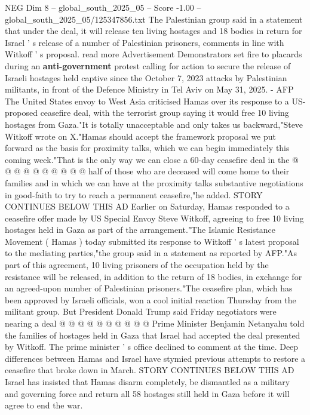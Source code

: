 \begin{textsample}{NEG Dim 8 – global\_south\_2025\_05 – Score -1.00 – global\_south\_2025\_05/125347856.txt}  \label{ex:f8_neg_309}
The Palestinian group said in a statement that under the deal, it will release ten living hostages and 18 bodies in return for Israel ' s release of a number of Palestinian prisoners, comments in line with Witkoff ' s proposal. read more Advertisement Demonstrators set fire to placards during an \textbf{anti-government} protest calling for action to secure the release of Israeli hostages held captive since the October 7, 2023 attacks by Palestinian militants, in front of the Defence Ministry in Tel Aviv on May 31, 2025. - AFP The United States envoy to West Asia criticised Hamas over its response to a US-proposed ceasefire deal, with the terrorist group saying it would free 10 living hostages from Gaza."It is totally unacceptable and only takes us backward,"Steve Witkoff wrote on X."Hamas should accept the framework proposal we put forward as the basis for proximity talks, which we can begin immediately this coming week."That is the only way we can close a 60-day ceasefire deal in the @ @ @ @ @ @ @ @ @ @ half of those who are deceased will come home to their families and in which we can have at the proximity talks substantive negotiations in good-faith to try to reach a permanent ceasefire,"he added.
STORY CONTINUES BELOW THIS AD Earlier on Saturday, Hamas responded to a ceasefire offer made by US Special Envoy Steve Witkoff, agreeing to free 10 living hostages held in Gaza as part of the arrangement."The Islamic Resistance Movement ( Hamas ) today submitted its response to Witkoff ' s latest proposal to the mediating parties,"the group said in a statement as reported by AFP."As part of this agreement, 10 living prisoners of the occupation held by the resistance will be released, in addition to the return of 18 bodies, in exchange for an agreed-upon number of Palestinian prisoners."The ceasefire plan, which has been approved by Israeli officials, won a cool initial reaction Thursday from the militant group.
But President Donald Trump said Friday negotiators were nearing a deal @ @ @ @ @ @ @ @ @ @ Prime Minister Benjamin Netanyahu told the families of hostages held in Gaza that Israel had accepted the deal presented by Witkoff.
The prime minister ' s office declined to comment at the time.
Deep differences between Hamas and Israel have stymied previous attempts to restore a ceasefire that broke down in March.
STORY CONTINUES BELOW THIS AD Israel has insisted that Hamas disarm completely, be dismantled as a military and governing force and return all 58 hostages still held in Gaza before it will agree to end the war.

\end{textsample}
